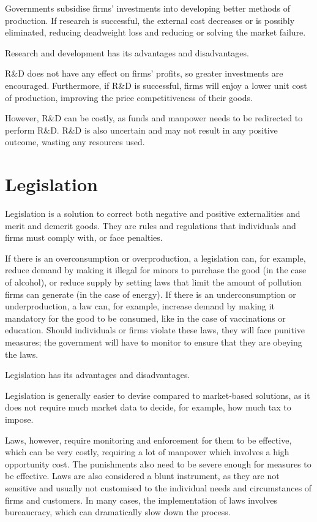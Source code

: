 \documentclass[Economics.tex]{subfiles}
\begin{document}
Governments subsidise firms' investments into developing better methods of production. If research is successful, the external cost decreases or is possibly eliminated, reducing deadweight loss and reducing or solving the market failure.

Research and development has its advantages and disadvantages.

R\&D does not have any effect on firms' profits, so greater investments are encouraged. Furthermore, if R\&D is successful, firms will enjoy a lower unit cost of production, improving the price competitiveness of their goods.

However, R\&D can be costly, as funds and manpower needs to be redirected to perform R\&D. R\&D is also uncertain and may not result in any positive outcome, wasting any resources used.
\section{Legislation}
Legislation is a solution to correct both negative and positive externalities and merit and demerit goods. They are rules and regulations that individuals and firms must comply with, or face penalties.

If there is an overconsumption or overproduction, a legislation can, for example, reduce demand by making it illegal for minors to purchase the good (in the case of alcohol), or reduce supply by setting laws that limit the amount of pollution firms can generate (in the case of energy). If there is an underconsumption or underproduction, a law can, for example, increase demand by making it mandatory for the good to be consumed, like in the case of vaccinations or education. Should individuals or firms violate these laws, they will face punitive measures; the government will have to monitor to ensure that they are obeying the laws.

Legislation has its advantages and disadvantages.

Legislation is generally easier to devise compared to market-based solutions, as it does not require much market data to decide, for example, how much tax to impose.

Laws, however, require monitoring and enforcement for them to be effective, which can be very costly, requiring a lot of manpower which involves a high opportunity cost. The punishments also need to be severe enough for measures to be effective. Laws are also considered a blunt instrument, as they are not sensitive and usually not customised to the individual needs and circumstances of firms and customers. In many cases, the implementation of laws involves bureaucracy, which can dramatically slow down the process.
\end{document}
